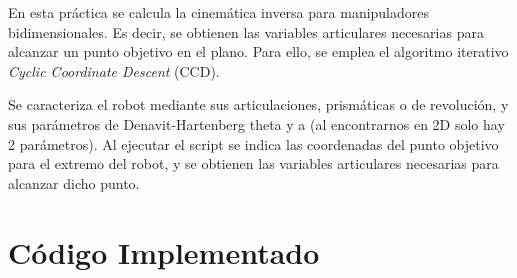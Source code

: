 En esta práctica se calcula la cinemática inversa para manipuladores bidimensionales. Es decir, se obtienen las variables articulares necesarias para alcanzar un punto objetivo en el plano. Para ello, se emplea el algoritmo iterativo \textit{Cyclic Coordinate Descent} (CCD).

\bigskip Se caracteriza el robot mediante sus articulaciones, prismáticas o de revolución, y sus parámetros de Denavit-Hartenberg theta y a (al encontrarnos en 2D solo hay 2 parámetros).
Al ejecutar el script se indica las coordenadas del punto objetivo para el extremo del robot, y se obtienen las variables articulares necesarias para alcanzar dicho punto.

\section{Código Implementado}

